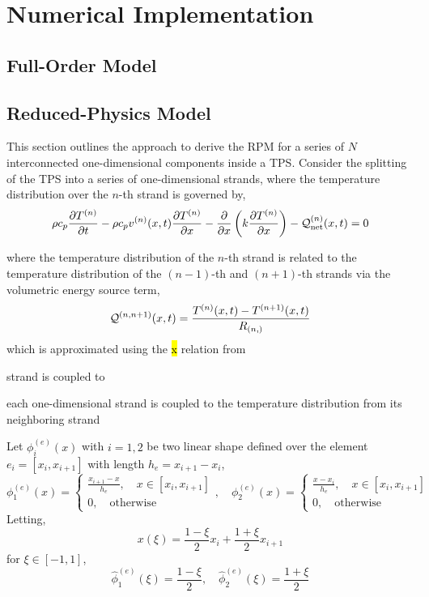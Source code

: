 \appendix

\section{Numerical Implementation}\label{app_implementation}

\subsection{Full-Order Model}

\subsection{Reduced-Physics Model}

This section outlines the approach to derive the RPM for a series of $N$ interconnected one-dimensional components inside a TPS. Consider the splitting of the TPS into a series of one-dimensional strands, where the temperature distribution over the $n$-th strand is governed by,
\begin{equation}
    \rho c_p\frac{\partial T^{(n)}}{\partial t} - \rho c_p v^{(n)}(x,t)\frac{\partial T^{(n)}}{\partial x} - \frac{\partial}{\partial x}\left(k\frac{\partial T^{(n)}}{\partial x}\right) - \mathcal{Q}^{(n)}_{\text{net}}(x,t) = 0
\end{equation}



where the temperature distribution of the $n$-th strand is related to the temperature distribution of the $(n-1)$-th and $(n+1)$-th strands via the volumetric energy source term,
\begin{equation}
    \mathcal{Q}^{(n,n+1)}(x,t) = \frac{T^{(n)}(x,t) - T^{(n+1)}(x,t)}{R_{(n,)}}
\end{equation}
which is approximated using the \hl{x} relation from 

strand is coupled to 

each one-dimensional strand is coupled to the temperature distribution from its neighboring strand 

Let $\phi^{(e)}_i(x)$ with $i=1,2$ be two linear shape defined over the element $e_i=[x_{i},x_{i+1}]$ with length $h_e=x_{i+1} - x_i$,
\begin{equation}
    \phi^{(e)}_1(x) = \left\{\begin{matrix}
        \frac{x_{i+1} - x}{h_e},\quad x\in[x_i,x_{i+1}]\\
        0, \quad \text{otherwise}
    \end{matrix}\right.,\quad\phi^{(e)}_2(x) = \left\{\begin{matrix}
        \frac{x - x_i}{h_e},\quad x\in[x_i,x_{i+1}]\\
        0, \quad \text{otherwise}
    \end{matrix}\right.
\end{equation}
Letting,
\[
    x(\xi) = \frac{1-\xi}{2}x_i + \frac{1 + \xi}{2}x_{i+1}
\]
for $\xi\in[-1,1]$,
\begin{equation}
    \hat{\phi}_1^{(e)}(\xi) = \frac{1 - \xi}{2},\quad \hat{\phi}_2^{(e)}(\xi) = \frac{1 + \xi}{2}
\end{equation}

